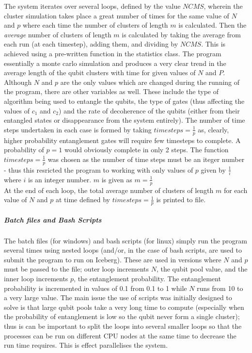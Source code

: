 \documentclass{article}
\numberwithin{equation}{section} %
\begin{document}
The system iterates over several loops, defined by the value $NCMS$, wherein the cluster simulation takes place a great number of times for the same value of $N$ and $p$ where each time the number of clusters of length $m$ is calculated. Then the \emph{average} number of clusters of length $m$ is calculated by taking the average from each run (at each timestep), adding them, and dividing by $NCMS$. This is achieved using a pre-written function in the statistics class. The program essentially a monte carlo simulation and produces a very clear trend in the average length of the qubit clusters with time for given values of $N$ and $P$. Although $N$ and $p$ are the only values which are changed during the running of the program, there are other variables as well. These include the type of algorithm being used to entangle the qubits, the type of gates (thus affecting the values of $c_1$ and $c_2$) and the rate of decoherence of the qubits (either from their entangled states or disappearance from the system entirely). The number of time steps undertaken in each case is formed by taking $timesteps= \frac{1}{p}$ as, clearly, higher probability entanglement gates will require few timesteps to complete. A probability of $p=1$ would obviously complete in only 2 steps. The function $timesteps= \frac{1}{p}$ was chosen as the number of time steps must be an iteger number - thus this resricted the program to working with only values of $p$ given by $\frac{1}{i}$ where $i$ is an integer number. $m$ is given as $m=\frac{1}{p}$ \\

At the end of each loop, the total average number of clusters of length $m$ for each value of $N$ and $p$ at time defined by $timesteps= \frac{1}{p}$ is printed to file. 

\subparagraph{Batch files and Bash Scripts}
The batch files (for windows) and bash scripts (for linux) simply run the program several times using nested loops (and/or, in the case of bash scripts, are used to submit the program to run on Iceberg). These are used in versions where $N$ and $p$ must be passed to the file; outer loop increments $N$, the qubit pool value, and the inner loop increments $p$, the entanglement probability. The entanglement probability is incremented in values of 0.1 from 0.1 to 1 while $N$ runs from 10 to a very large value. The main issue the use of scripts was initially designed to solve is that large qubit pools take a very long time to compute (especially when the probability of entanglement is low so the qubit never form a single cluster); thus is can be important to split the loops into several smaller loops so that the processes can be run on different CPU nodes at the same time to decrease the run time requires. This is effect parallelises the system.  \\
\end{document}
